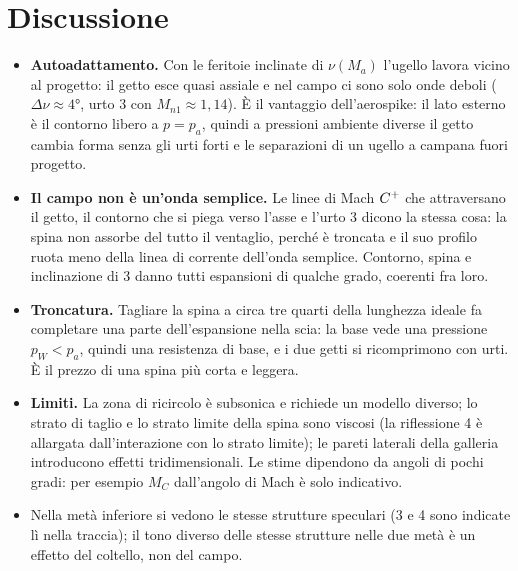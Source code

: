 \section*{Discussione}
\begin{itemize}
\item \textbf{Autoadattamento.} Con le feritoie inclinate di $\nu(M_a)$ l'ugello lavora vicino al progetto: il getto
  esce quasi assiale e nel campo ci sono solo onde deboli ($\Delta\nu\approx\ang{4}$, urto 3 con $M_{n1}\approx1{,}14$).
  È il vantaggio dell'aerospike: il lato esterno è il contorno libero a $p=p_a$, quindi a pressioni ambiente diverse il
  getto cambia forma senza gli urti forti e le separazioni di un ugello a campana fuori progetto.
\item \textbf{Il campo non è un'onda semplice.} Le linee di Mach $C^{+}$ che attraversano il getto, il contorno che si
  piega verso l'asse e l'urto 3 dicono la stessa cosa: la spina non assorbe del tutto il ventaglio, perché è troncata e
  il suo profilo ruota meno della linea di corrente dell'onda semplice. Contorno, spina e inclinazione di 3 danno tutti
  espansioni di qualche grado, coerenti fra loro.
\item \textbf{Troncatura.} Tagliare la spina a circa tre quarti della lunghezza ideale fa completare una parte
  dell'espansione nella scia: la base vede una pressione $p_W<p_a$, quindi una resistenza di base, e i due getti si
  ricomprimono con urti. È il prezzo di una spina più corta e leggera.
\item \textbf{Limiti.} La zona di ricircolo è subsonica e richiede un modello diverso; lo strato di taglio e lo strato
  limite della spina sono viscosi (la riflessione 4 è allargata dall'interazione con lo strato limite); le pareti
  laterali della galleria introducono effetti tridimensionali. Le stime dipendono da angoli di pochi gradi: per
  esempio $M_C$ dall'angolo di Mach è solo indicativo.
\item Nella metà inferiore si vedono le stesse strutture speculari (3 e 4 sono indicate lì nella traccia); il tono
  diverso delle stesse strutture nelle due metà è un effetto del coltello, non del campo.
\end{itemize}


